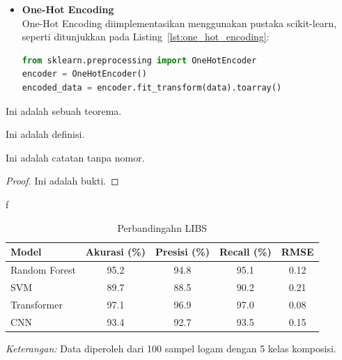 \begin{itemize}
\begin{itemize}
            \item \textbf{One-Hot Encoding} \\
                  One-Hot Encoding diimplementasikan menggunakan pustaka scikit-learn, seperti ditunjukkan pada Listing~\ref{lst:one_hot_encoding}:
                  \begin{lstlisting}[language=Python, caption=Contoh One-Hot Encoding dengan scikit-learn, label=lst:one_hot_encoding]
from sklearn.preprocessing import OneHotEncoder
encoder = OneHotEncoder()
encoded_data = encoder.fit_transform(data).toarray()
                  \end{lstlisting}
        \end{itemize}
\end{itemize}

\begin{theorem}
Ini adalah sebuah teorema.
\end{theorem}

\begin{definition}
Ini adalah definisi.
\end{definition}

\begin{remark}
Ini adalah catatan tanpa nomor.
\end{remark} 

\begin{proof}
Ini adalah bukti.
\end{proof}
 \begin{example}
        f
 \end{example}


 \begin{table}[H]
    \centering
    \caption{Perbandingahn  LIBS}
    \label{tab:performa_ml}
    \centering
    \begin{tabular}{lcccc}
      \toprule
      Model & Akurasi (\%) & Presisi (\%) & Recall (\%) & RMSE \\
      \midrule
      Random Forest & 95.2 & 94.8 & 95.1 & 0.12 \\
      SVM & 89.7 & 88.5 & 90.2 & 0.21 \\
      Transformer & 97.1 & 96.9 & 97.0 & 0.08 \\
      \midrule
      CNN & 93.4 & 92.7 & 93.5 & 0.15 \\
      \bottomrule
    \end{tabular}
    
    \smallskip
    \footnotesize
    \textit{Keterangan:} Data diperoleh dari 100 sampel logam dengan 5 kelas komposisi.
  \end{table}

%
